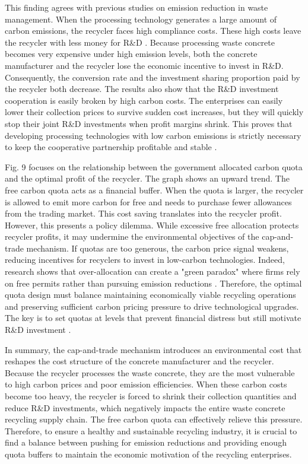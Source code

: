 \documentclass[authoryear,preprint,review,times,10pt]{elsarticle}
\begin{document}
This finding agrees with previous studies on emission reduction in waste management. When the processing technology generates a large amount of carbon emissions, the recycler faces high compliance costs. These high costs leave the recycler with less money for R\&D \citep{besklubova2026Establishing}. Because processing waste concrete becomes very expensive under high emission levels, both the concrete manufacturer and the recycler lose the economic incentive to invest in R\&D. Consequently, the conversion rate and the investment sharing proportion paid by the recycler both decrease. The results also show that the R\&D investment cooperation is easily broken by high carbon costs. The enterprises can easily lower their collection prices to survive sudden cost increases, but they will quickly stop their joint R\&D investments when profit margins shrink. This proves that developing processing technologies with low carbon emissions is strictly necessary to keep the cooperative partnership profitable and stable \citep{chen2025Lowcarbon}.

Fig. 9 focuses on the relationship between the government allocated carbon quota and the optimal profit of the recycler. The graph shows an upward trend. The free carbon quota acts as a financial buffer. When the quota is larger, the recycler is allowed to emit more carbon for free and needs to purchase fewer allowances from the trading market. This cost saving translates into the recycler profit.
However, this presents a policy dilemma. While excessive free allocation protects recycler profits, it may undermine the environmental objectives of the cap-and-trade mechanism. If quotas are too generous, the carbon price signal weakens, reducing incentives for recyclers to invest in low-carbon technologies. Indeed, research shows that over-allocation can create a "green paradox" where firms rely on free permits rather than pursuing emission reductions \citep{huang2024Optimal}. Therefore, the optimal quota design must balance maintaining economically viable recycling operations and preserving sufficient carbon pricing pressure to drive technological upgrades. The key is to set quotas at levels that prevent financial distress but still motivate R\&D investment \citep{peng2022If}.

In summary, the cap-and-trade mechanism introduces an environmental cost that reshapes the cost structure of the concrete manufacturer and the recycler. Because the recycler processes the waste concrete, they are the most vulnerable to high carbon prices and poor emission efficiencies. When these carbon costs become too heavy, the recycler is forced to shrink their collection quantities and reduce R\&D investments, which negatively impacts the entire waste concrete recycling supply chain. The free carbon quota can effectively relieve this pressure. Therefore, to ensure a healthy and sustainable recycling industry, it is crucial to find a balance between pushing for emission reductions and providing enough quota buffers to maintain the economic motivation of the recycling enterprises.
\end{document}
